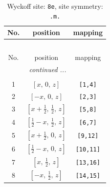 \documentclass[fleqn,8pt]{jsarticle}
\begin{document}
\renewcommand{\arraystretch}{1.2}
\begin{longtable}{ccc}
\caption{Wyckoff site: {\tt 8e}, site symmetry: {\tt .m.}}
 \\
 \hline \hline
No. & position & mapping \\ \hline \endfirsthead

\multicolumn{2}{l}{\tablename\ \thetable{}} \\
 \hline \hline
No. & position & mapping \\ \hline \endhead

 \hline \hline
\multicolumn{2}{r}{\footnotesize\it continued ...} \\ \endfoot

 \hline \hline
\multicolumn{2}{r}{} \\ \endlastfoot

1 & $\left[ x,\, 0,\, z \right]$ & {\tt [1,4]} \\ \hline
2 & $\left[ - x,\, 0,\, z \right]$ & {\tt [2,3]} \\ \hline
3 & $\left[ x + \frac{1}{2},\, \frac{1}{2},\, z \right]$ & {\tt [5,8]} \\ \hline
4 & $\left[ \frac{1}{2} - x,\, \frac{1}{2},\, z \right]$ & {\tt [6,7]} \\ \hline
5 & $\left[ x + \frac{1}{2},\, 0,\, z \right]$ & {\tt [9,12]} \\ \hline
6 & $\left[ \frac{1}{2} - x,\, 0,\, z \right]$ & {\tt [10,11]} \\ \hline
7 & $\left[ x,\, \frac{1}{2},\, z \right]$ & {\tt [13,16]} \\ \hline
8 & $\left[ - x,\, \frac{1}{2},\, z \right]$ & {\tt [14,15]} \\
\end{longtable}
\renewcommand{\arraystretch}{1.2}
\end{document}
